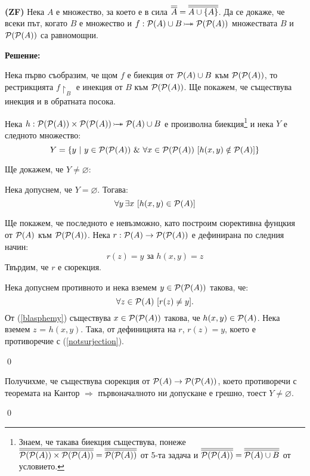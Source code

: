 \begin{problem}
\textbf{(ZF)}
Нека $A$ е множество, за което е в сила $\overline{\overline{A}} = \overline{\overline{A \cup \{A\}}}$.
Да се докаже, че всеки път, когато $B$ е множество и $f: \pow(A) \cup B \bijarrow \pow(\pow(A))$
множествата $B$ и $\mathcal{P}(\mathcal{P}(A))$ са равномощни.
\end{problem}

\textbf{Решение:}

\smallbreak
\quad
Нека първо съобразим, че щом $f$ е биекция от $\mathcal{P}(A) \cup B$ към $\mathcal{P}(\mathcal{P}(A))$,
то рестрикцията $f\restriction_B$ е инекция от $B$ към $\mathcal{P}(\mathcal{P}(A))$.
Ще покажем, че съществува инекция и в обратната посока.

\quad
Нека $h: \pow(\pow(A)) \times \pow(\pow(A)) \bijarrow \pow(A) \cup B$ е произволна биекция\footnote[2]{Знаем, че такава биекция съществува, понеже
$\overline{\overline{\mathcal{P}(\mathcal{P}(A)) \times \mathcal{P}(\mathcal{P}(A))}} = \overline{\overline{\mathcal{P}(\mathcal{P}(A))}}$ от 5-та задача и $\overline{\overline{\mathcal{P}(\mathcal{P}(A))}} = \overline{\overline{\mathcal{P}(A) \cup B}}$ от условието.}
и нека $Y$ е следното множество:
\[
Y = \{y\ |\ y \in \mathcal{P}(\mathcal{P}(A)) \ \&\  \forall x \in \mathcal{P}(\mathcal{P}(A))\ [h(x, y) \notin \mathcal{P}(A)]\}
\]

\quad
Ще докажем, че $Y \ne \varnothing$:
\begin{tcolorbox}[mybox={Доказателство:}]
\quad
Нека допуснем, че $Y = \varnothing$. Тогава:
\begin{equation}\label{blasphemy}
\forall y\, \exists x\ [h(x, y) \in \mathcal{P}(A)]
\end{equation}

\quad
Ще покажем, че последното е невъзможно, като построим сюрективна фунцкия от $\mathcal{P}(A)$ към $\mathcal{P}(\mathcal{P}(A))$.
Нека $r: \mathcal{P}(A) \to \mathcal{P}(\mathcal{P}(A))$ е дефинирана по следния начин:
\[
r(z) = y \text{ за } h(x, y) = z
\]
\quad
Твърдим, че $r$ е сюрекция.

\begin{tcolorbox}[mybox={Доказателство:}, colback=green!20, colframe=green!60]
\quad
Нека допуснем противното и нека вземем $y \in \mathcal{P}(\mathcal{P}(A))$ такова, че:
\begin{equation}\label{notsurjection}
\forall z \in \mathcal{P}(A)\ [r(z) \ne y].
\end{equation}
\quad
От (\ref{blasphemy}) съществува $x \in \mathcal{P}(\mathcal{P}(A))$ такова, че $h(x, y) \in \mathcal{P}(A)$.
Нека вземем $z$ = $h(x, y)$.
Така, от дефиницията на $r$, $r(z) = y$, което е противоречие с (\ref{notsurjection}).

\qed
\end{tcolorbox}

\quad
Получихме, че съществува сюрекция от $\mathcal{P}(A) \to \mathcal{P}(\mathcal{P}(A))$,
което противоречи с теоремата на Кантор $\Rightarrow$ първоначалното ни допускане е грешно, тоест $Y \ne \varnothing$.


\qed

\end{tcolorbox}

